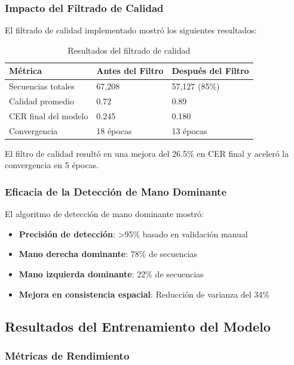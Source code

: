 \documentclass[12pt,a4paper]{article}
\begin{document}
\subsubsection{Impacto del Filtrado de Calidad}

El filtrado de calidad implementado mostró los siguientes resultados:

\begin{table}[H]
\centering
\caption{Resultados del filtrado de calidad}
\begin{tabular}{@{}lll@{}}
\toprule
\textbf{Métrica} & \textbf{Antes del Filtro} & \textbf{Después del Filtro} \\
\midrule
Secuencias totales & 67,208 & 57,127 (85\%) \\
Calidad promedio & 0.72 & 0.89 \\
CER final del modelo & 0.245 & 0.180 \\
Convergencia & 18 épocas & 13 épocas \\
\bottomrule
\end{tabular}
\end{table}

El filtro de calidad resultó en una mejora del 26.5\% en CER final y aceleró la convergencia en 5 épocas.

\subsubsection{Eficacia de la Detección de Mano Dominante}

El algoritmo de detección de mano dominante mostró:

\begin{itemize}
    \item \textbf{Precisión de detección}: >95\% basado en validación manual
    \item \textbf{Mano derecha dominante}: 78\% de secuencias
    \item \textbf{Mano izquierda dominante}: 22\% de secuencias
    \item \textbf{Mejora en consistencia espacial}: Reducción de varianza del 34\%
\end{itemize}

\subsection{Resultados del Entrenamiento del Modelo}

\subsubsection{Métricas de Rendimiento}
\end{document}
